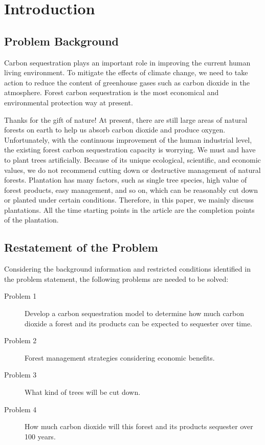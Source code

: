 \documentclass[12pt]{article}
\begin{document}
\section{Introduction}
\subsection{Problem Background}
Carbon sequestration plays an important role in improving the current human
living environment. To mitigate the effects of climate change, we need to take
action to reduce the content of greenhouse gases such as carbon dioxide in the
atmosphere. Forest carbon sequestration is the most economical and
environmental protection way at present.

Thanks for the gift of nature! At present, there are still large areas of
natural forests on earth to help us absorb carbon dioxide and produce oxygen.
Unfortunately, with the continuous improvement of the human industrial level,
the existing forest carbon sequestration capacity is worrying. We must and have
to plant trees artificially. Because of its unique ecological, scientific, and
economic values, we do not recommend cutting down or destructive management of
natural forests. Plantation has many factors, such as single tree species, high
value of forest products, easy management, and so on, which can be reasonably
cut down or planted under certain conditions. Therefore, in this paper, we
mainly discuss plantations. All the time starting points in the article are the
completion points of the plantation.
\subsection{Restatement of the Problem}
Considering the background information and restricted conditions identified in
the problem statement, the following problems are needed to be solved:
\begin{description}
    \item[\ddag{} Problem 1] Develop a carbon sequestration model to determine how much%
        carbon dioxide a forest and its products can be expected to sequester over time.
    \item[\ddag{} Problem 2] Forest management strategies considering economic benefits.
    \item[\ddag{} Problem 3] What kind of trees will be cut down.
    \item[\ddag{} Problem 4] How much carbon dioxide will this forest and its products sequester over 100 years.
\end{description}
\end{document}
